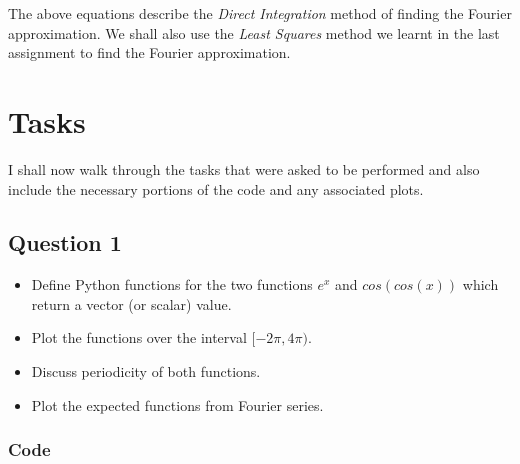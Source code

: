 \documentclass[11pt, a4paper, twoside]{article}
\begin{document}
        The above equations describe the \textit{Direct Integration} method of finding the Fourier approximation. We shall also use the \textit{Least Squares} method we learnt in the last assignment to find the Fourier approximation.

    \section{Tasks}
        I shall now walk through the tasks that were asked to be performed and also include the necessary portions of the code and any associated plots.
        \subsection{Question 1}
            \begin{itemize}[label=-]
                \item Define Python functions for the two functions $e^x$ and $cos(cos(x))$ which return a vector (or scalar) value.
                \item Plot the functions over the interval $[-2\pi,4\pi)$.
                \item Discuss periodicity of both functions.
                \item Plot the expected functions from Fourier series.
            \end{itemize}
            \subsubsection{Code}
                \inputminted[linenos, breaklines]{python}{Code/q1.py}
\end{document}
